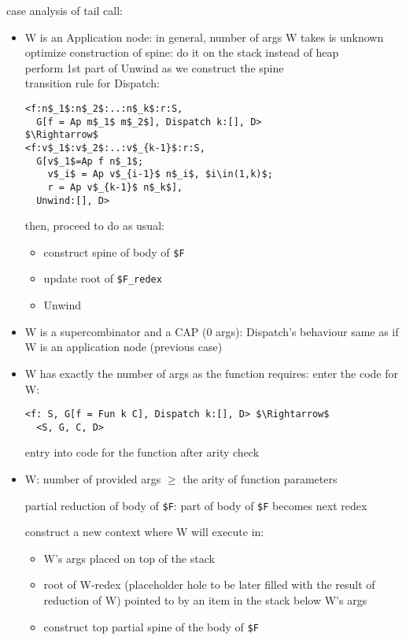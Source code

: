 \documentclass[8pt]{extarticle}
\begin{document}
\begin{multicols*}{2}
case analysis of tail call:
\begin{itemize}
\item W is an Application node: in general, number of args W takes is unknown\\
  optimize construction of spine: do it on the stack instead of heap\\
  perform 1st part of Unwind as we construct the spine\\

  transition rule for Dispatch:

\begin{lstlisting}
<f:n$_1$:n$_2$:..:n$_k$:r:S,
  G[f = Ap m$_1$ m$_2$], Dispatch k:[], D>
$\Rightarrow$
<f:v$_1$:v$_2$:..:v$_{k-1}$:r:S,
  G[v$_1$=Ap f n$_1$;
    v$_i$ = Ap v$_{i-1}$ n$_i$, $i\in(1,k)$;
    r = Ap v$_{k-1}$ n$_k$],
  Unwind:[], D>
\end{lstlisting}

then, proceed to do as usual:
\begin{itemize}
\item construct spine of body of \verb|$F|
\item update root of \verb|$F_redex|
\item Unwind
\end{itemize}

\item W is a supercombinator and a CAP (0 args):
  Dispatch's behaviour same as if W is an application node (previous case)

\item W has exactly the number of args as the function requires: enter the code for W:
\begin{lstlisting}
<f: S, G[f = Fun k C], Dispatch k:[], D> $\Rightarrow$
  <S, G, C, D>  
\end{lstlisting}

entry into code for the function after arity check

\item W: number of provided args $\geq$ the arity of function parameters

  partial reduction of body of \verb|$F|: part of body of \verb|$F| becomes next redex

  construct a new context where W will execute in:
  \begin{itemize}
  \item W's args placed on top of the stack
  \item root of W-redex (placeholder hole to be later filled with the result of reduction of W) pointed to by an item in the stack below W's args
  \item construct top partial spine of the body of \verb|$F|
  \end{itemize}


\end{itemize}
\end{multicols*}
\end{document}
